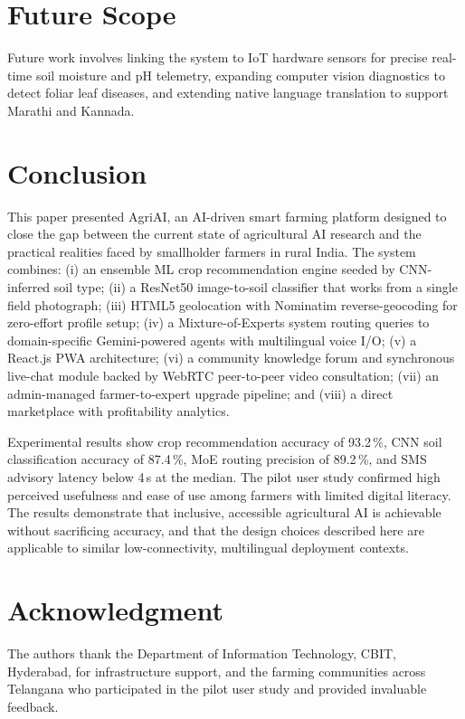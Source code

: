 \documentclass[conference]{IEEEtran}
\begin{document}
\section{Future Scope}
Future work involves linking the system to IoT hardware sensors for precise real-time soil moisture and pH telemetry, expanding computer vision diagnostics to detect foliar leaf diseases, and extending native language translation to support Marathi and Kannada.
\section{Conclusion}

This paper presented AgriAI, an AI-driven smart farming platform designed
to close the gap between the current state of agricultural AI research and
the practical realities faced by smallholder farmers in rural India. The
system combines: (i) an ensemble ML crop recommendation engine seeded by
CNN-inferred soil type; (ii) a ResNet50 image-to-soil classifier that works
from a single field photograph; (iii) HTML5 geolocation with Nominatim
reverse-geocoding for zero-effort profile setup; (iv) a Mixture-of-Experts
system routing queries to domain-specific Gemini-powered agents with
multilingual voice I/O; (v) a React.js PWA architecture; (vi) a
community knowledge forum and synchronous live-chat module backed by
WebRTC peer-to-peer video consultation; (vii) an admin-managed
farmer-to-expert upgrade pipeline; and (viii) a direct marketplace with
profitability analytics.

Experimental results show crop recommendation accuracy of 93.2\,\%, CNN soil
classification accuracy of 87.4\,\%, MoE routing precision of 89.2\,\%, and
SMS advisory latency below 4\,s at the median. The pilot user study confirmed
high perceived usefulness and ease of use among farmers with limited digital
literacy. The results demonstrate that inclusive, accessible agricultural AI
is achievable without sacrificing accuracy, and that the design choices
described here are applicable to similar low-connectivity, multilingual
deployment contexts.

\section*{Acknowledgment}
The authors thank the Department of Information Technology, CBIT, Hyderabad,
for infrastructure support, and the farming communities across Telangana who
participated in the pilot user study and provided invaluable feedback.
\end{document}
